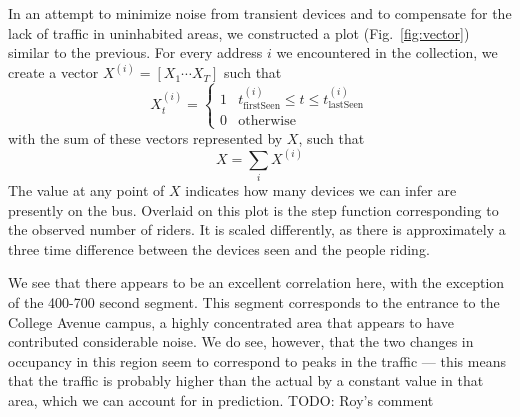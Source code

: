 In an attempt to minimize noise from transient devices and to compensate for the lack of traffic in uninhabited areas, we constructed a plot (Fig.~\ref{fig:vector}) similar to the previous.
For every address $i$ we encountered in the collection, we create a vector \(X^{(i)}= [ X_1 \cdots X_T ] \) such that
\begin{equation*}
  X_t^{(i)} = \begin{cases}
    1 & t_{\text{firstSeen}}^{(i)} \le t \le t_{\text{lastSeen}}^{(i)}\\
    0 & \text{otherwise}
  \end{cases}
\end{equation*}
with the sum of these vectors represented by $X$, such that \[X = \sum\limits_i X^{(i)}\]
The value at any point of $X$ indicates how many devices we can infer are presently on the bus.
Overlaid on this plot is the step function corresponding to the observed number of riders.
It is scaled differently, as there is approximately a three time difference between the devices seen and the people riding.

We see that there appears to be an excellent correlation here, with the exception of the 400-700 second segment. %
This segment corresponds to the entrance to the College Avenue campus, a highly concentrated area that appears to have contributed considerable noise.
We do see, however, that the two changes in occupancy in this region seem to correspond to peaks in the traffic --- this means that the traffic is probably higher than the actual by a constant value in that area, which we can account for in prediction. TODO: Roy's comment
